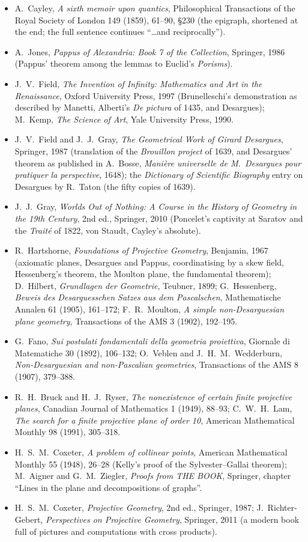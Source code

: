 \begin{itemize}
\item A.~Cayley, \emph{A sixth memoir upon quantics}, Philosophical Transactions of the Royal Society of London 149 (1859), 61--90, \S230 (the
epigraph, shortened at the end; the full sentence continues ``\dots and reciprocally'').
\item A.~Jones, \emph{Pappus of Alexandria: Book 7 of the Collection}, Springer, 1986 (Pappus' theorem among the lemmas to Euclid's
\emph{Porisms}).
\item J.~V.~Field, \emph{The Invention of Infinity: Mathematics and Art in the Renaissance}, Oxford University Press, 1997 (Brunelleschi's
demonstration as described by Manetti, Alberti's \emph{De pictura} of 1435, and Desargues); M.~Kemp, \emph{The Science of Art}, Yale University
Press, 1990.
\item J.~V.~Field and J.~J.~Gray, \emph{The Geometrical Work of Girard Desargues}, Springer, 1987 (translation of the \emph{Brouillon project} of
1639, and Desargues' theorem as published in A.~Bosse, \emph{Mani\`ere universelle de M.~Desargues pour pratiquer la perspective}, 1648); the
\emph{Dictionary of Scientific Biography} entry on Desargues by R.~Taton (the fifty copies of 1639).
\item J.~J.~Gray, \emph{Worlds Out of Nothing: A Course in the History of Geometry in the 19th Century}, 2nd ed., Springer, 2010 (Poncelet's captivity at
Saratov and the \emph{Trait\'e} of 1822, von Staudt, Cayley's absolute).
\item R.~Hartshorne, \emph{Foundations of Projective Geometry}, Benjamin, 1967 (axiomatic planes, Desargues and Pappus, coordinatising by a skew
field, Hessenberg's theorem, the Moulton plane, the fundamental theorem); D.~Hilbert, \emph{Grundlagen der Geometrie}, Teubner, 1899;
G.~Hessenberg, \emph{Beweis des Desarguesschen Satzes aus dem Pascalschen}, Mathematische Annalen 61 (1905), 161--172; F.~R.~Moulton, \emph{A simple
non-Desarguesian plane geometry}, Transactions of the AMS 3 (1902), 192--195.
\item G.~Fano, \emph{Sui postulati fondamentali della geometria proiettiva}, Giornale di Matematiche 30 (1892), 106--132; O.~Veblen and
J.~H.~M.~Wedderburn, \emph{Non-Desarguesian and non-Pascalian geometries}, Transactions of the AMS 8 (1907), 379--388.
\item R.~H.~Bruck and H.~J.~Ryser, \emph{The nonexistence of certain finite projective planes}, Canadian Journal of Mathematics 1 (1949), 88--93;
C.~W.~H.~Lam, \emph{The search for a finite projective plane of order 10}, American Mathematical Monthly 98 (1991), 305--318.
\item H.~S.~M.~Coxeter, \emph{A problem of collinear points}, American Mathematical Monthly 55 (1948), 26--28 (Kelly's proof of the
Sylvester--Gallai theorem); M.~Aigner and G.~M.~Ziegler, \emph{Proofs from THE BOOK}, Springer, chapter ``Lines in the plane and decompositions of
graphs''.
\item H.~S.~M.~Coxeter, \emph{Projective Geometry}, 2nd ed., Springer, 1987; J.~Richter-Gebert, \emph{Perspectives on Projective Geometry}, Springer,
2011 (a modern book full of pictures and computations with cross products).
\end{itemize}
